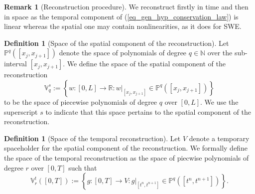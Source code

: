 \documentclass[12pt,a4paper]{article}
\numberwithin{equation}{section}
\theoremstyle{definition}
\newcommand{\polygsna}[2]{\mathbb{P}^{#1}\qp{#2}}
\newcommand{\qp}[1]{\left(#1\right)}
\newcommand{\qb}[1]{\left[#1\right]}
\newcommand{\bracegs}[1]{\left\lbrace#1\right\rbrace}
\newtheorem{Defn}[subsection]{Definition}
\newtheorem{Rem}[subsection]{Remark}
\begin{document}
\begin{Rem}[Reconstruction procedure]
We reconstruct firstly in time and then in space as the temporal component of (\ref{eq_gen_hyp_conservation_law}) is linear whereas the spatial one may contain nonlinearities, as it does for SWE.
\end{Rem}
\begin{Defn}[Space of the spatial component of the reconstruction]
Let $\polygsna{q}{\qb{x_j, x_{j+1}}}$  denote the space of polynomials of degree $q\in\mathbb{N}$ over the sub-interval $\qb{x_j, x_{j+1}}$.  We define the space of the spatial component of the reconstruction 
\begin{equation}
\mathbb{V}_q^s:=\bracegs{w:\qb{0,L}\rightarrow\mathbb{R}: w|_{\qb{x_j,x_{j+1}}}\in \polygsna{q}{\qb{x_j, x_{j+1}}}}
\end{equation}
to be the space of piecewise polynomials of degree $q$ over $\qb{0,L}$.  We use the superscript $s$ to indicate that this space pertains to the spatial component of the reconstruction.
\end{Defn}

\begin{Defn}[Space of the temporal reconstruction]
 Let $V$ denote a temporary spaceholder for the spatial component of the reconstruction. We formally define the space of the temporal reconstruction as the space of piecwise polynomials of degree $r$ over $\qb{0,T}$ such that
\begin{equation}
\mathbb{V}_r^t\qp{\qb{0,T}}:=\bracegs{g:\qb{0,T}\rightarrow V: g|_{\qb{t^n, t^{n+1}}}\in \polygsna{q}{\qb{t^n, t^{n+1}}}}.
\end{equation}
\end{Defn}
 
\end{document}

